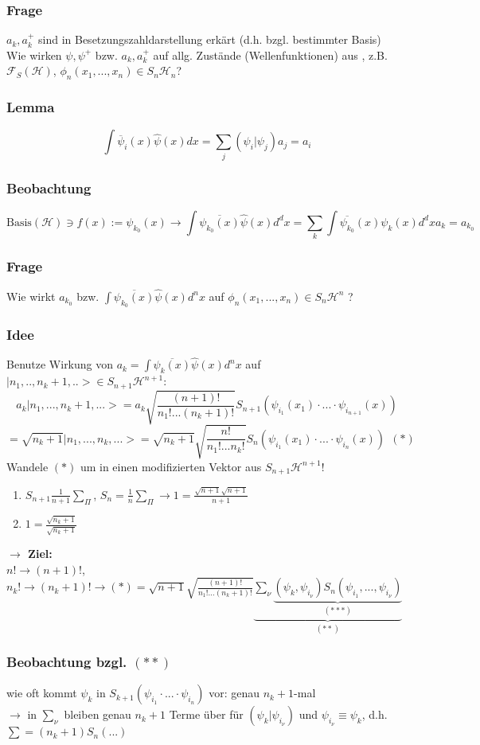\documentclass[twoside,a4paper]{scrartcl}
\renewcommand{\1}{\mathds{1}}
\newcommand{\ra}{\rightarrow}
\renewcommand{\H}{\mathcal{H}}
\newcommand{\F}{\mathcal{F}}
\begin{document}
\subsubsection*{Frage}
$a_k,a_k^+$ sind in Besetzungszahldarstellung erkärt (d.h. bzgl. bestimmter Basis)\\
Wie wirken $\psi,\psi^+$ bzw. $a_k,a_k^+$ auf allg. Zustände (Wellenfunktionen) aus , z.B. $\F_S(\H)$, $\phi_n(x_1,...,x_n)\in S_n\H_n$?
\subsubsection*{Lemma}
$$\int \overline{\psi}_i (x) \hat \psi(x) dx= \sum_j (\psi_i|\psi_j)a_j=a_i$$
\subsubsection*{Beobachtung}
$$\mathrm{Basis}(\H)\ni f(x):= \psi_{k_0}(x) \ra \int \overline{\psi_{k_0}(x)}\hat \psi(x)d^dx=\sum_k \int \overline{\psi_{k_0}}(x)\psi_k(x)d^dx a_k=a_{k_0}$$
\subsubsection*{Frage}
Wie wirkt $a_{k_0}$ bzw. $\int \overline{\psi_{k_0}(x)}\hat \psi(x)d^nx$ auf $\phi_n(x_1,...,x_n)\in S_n\H^n$ ?
\subsubsection*{Idee}
Benutze Wirkung von $a_k=\int \overline{\psi_{k}(x)}\hat \psi(x)d^nx$ auf $|n_1,..,n_k+1,..>\in S_{n+1}\H^{n+1}$:
$$a_k|n_1,...,n_k+1,...>=a_k \sqrt{\frac{(n+1)!}{n_1!...(n_k+1)!}}S_{n+1}(\psi_{i_1}(x_1)\cdot ... \cdot \psi_{i_{n+1}}(x))$$
$$=\sqrt{n_k+1}|n_1,...,n_k,...>=\sqrt{n_k+1} \sqrt{\frac{n!}{n_1!...n_k!}}S_{n}(\psi_{i_1}(x_1)\cdot ... \cdot \psi_{i_{n}}(x))  \ \ (*)$$
Wandele $(*)$ um in einen modifizierten Vektor aus $S_{n+1}\H^{n+1}$!
\begin{enumerate}
\item $S_{n+1}\frac{1}{n+1} \sum_\Pi$, $S_n=\frac{1}{n}\sum_\Pi \ra 1=\frac{\sqrt{n+1}\sqrt{n+1}}{n+1}$
\item $1=\frac{\sqrt{n_k+1}}{\sqrt{n_k+1}}$
\end{enumerate}
\textbf{$\ra$ Ziel:}\\
$n! \ra (n+1)!$, $n_k! \ra (n_k+1)! \ra (*)=\sqrt{n+1}\sqrt{\frac{(n+1)!}{n_1!...(n_k+1)!}} \underbrace{\sum_\nu \underbrace{(\psi_k,\psi_{i_\nu})S_n(\psi_{i_1},...,\psi_{i_\nu})}_{(***)} }_{(**)}$
\subsubsection*{Beobachtung bzgl. $(**)$}
wie oft kommt $\psi_k$ in $S_{k+1}(\psi_{i_1}\cdot...\cdot\psi_{i_n})$ vor: genau $n_k+1$-mal\\
$\ra$ in $\sum_\nu$ bleiben genau $n_k+1$ Terme über für $(\psi_k|\psi_{i_\nu})$ und $\psi_{i_\nu} \equiv \psi_k$, d.h. $\sum=(n_k+1)S_n(...)$
\end{document}
